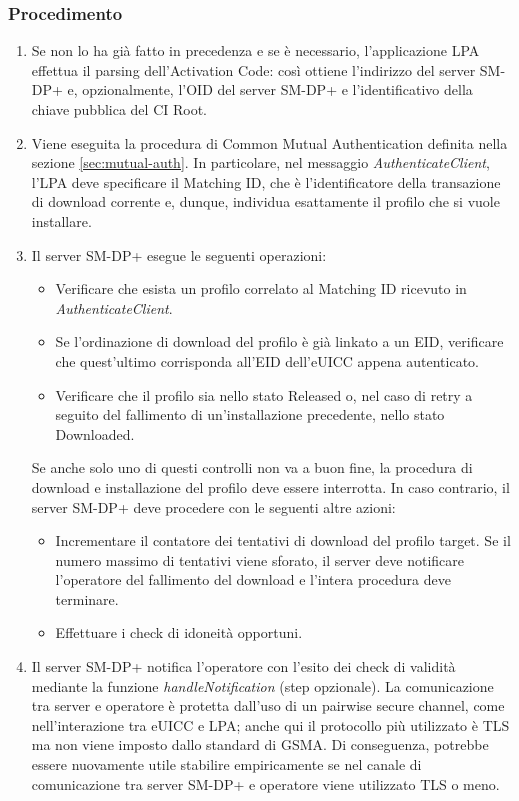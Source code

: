 \documentclass[10pt, oneside]{book}
\begin{document}
\subsubsection{Procedimento}
\begin{enumerate}
\item Se non lo ha già fatto in precedenza e se è necessario, l'applicazione LPA effettua il parsing dell'Activation Code: così ottiene l'indirizzo del server SM-DP+ e, opzionalmente, l'OID del server SM-DP+ e l'identificativo della chiave pubblica del CI Root.
\item Viene eseguita la procedura di Common Mutual Authentication definita nella sezione \ref{sec:mutual-auth}. In particolare, nel messaggio \textit{AuthenticateClient}, l'LPA deve specificare il Matching ID, che è l'identificatore della transazione di download corrente e, dunque, individua esattamente il profilo che si vuole installare.
\item Il server SM-DP+ esegue le seguenti operazioni:
\begin{itemize}[itemsep=0pt]
\item Verificare che esista un profilo correlato al Matching ID ricevuto in \textit{AuthenticateClient}.
\item Se l'ordinazione di download del profilo è già linkato a un EID, verificare che quest'ultimo corrisponda all'EID dell'eUICC appena autenticato.
\item Verificare che il profilo sia nello stato Released o, nel caso di retry a seguito del fallimento di un'installazione precedente, nello stato Downloaded.
\end{itemize}
Se anche solo uno di questi controlli non va a buon fine, la procedura di download e installazione del profilo deve essere interrotta. In caso contrario, il server SM-DP+ deve procedere con le seguenti altre azioni:
\begin{itemize}[itemsep=0pt]
\item Incrementare il contatore dei tentativi di download del profilo target. Se il numero massimo di tentativi viene sforato, il server deve notificare l'operatore del fallimento del download e l'intera procedura deve terminare.
\item Effettuare i check di idoneità opportuni.
\end{itemize}
\item Il server SM-DP+ notifica l'operatore con l'esito dei check di validità mediante la funzione \textit{handleNotification} (step opzionale). La comunicazione tra server e operatore è protetta dall'uso di un pairwise secure channel, come nell'interazione tra eUICC e LPA; anche qui il protocollo più utilizzato è TLS ma non viene imposto dallo standard di GSMA. Di conseguenza, potrebbe essere nuovamente utile stabilire empiricamente se nel canale di comunicazione tra server SM-DP+ e operatore viene utilizzato TLS o meno.

\end{enumerate}
\end{document}
